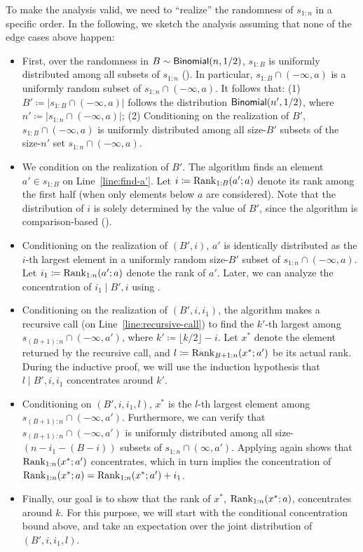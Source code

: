 To make the analysis valid, we need to ``realize'' the randomness of $s_{1:n}$ in a specific order. In the following, we sketch the analysis assuming that none of the edge cases above happen:
\begin{itemize}
    \item First, over the randomness in $B \sim \mathsf{Binomial}(n, 1/2)$, $s_{1:B}$ is uniformly distributed among all subsets of $s_{1:n}$ (). In particular, $s_{1:B} \cap (-\infty, a)$ is a uniformly random subset of $s_{1:n} \cap (-\infty, a)$. It follows that: (1) $B' \coloneqq |s_{1:B} \cap (-\infty, a)|$ follows the distribution $\mathsf{Binomial}(n', 1/2)$, where $n' \coloneqq |s_{1:n} \cap (-\infty, a)|$; (2) Conditioning on the realization of $B'$, $s_{1:B} \cap (-\infty, a)$ is uniformly distributed among all size-$B'$ subsets of the size-$n'$ set $s_{1:n} \cap (-\infty, a)$. 
    \item We condition on the realization of $B'$. The algorithm finds an element $a' \in s_{1:B}$ on Line~\ref{line:find-a'}. Let $i \coloneqq \mathrm{Rank}_{1:B}(a'; a)$ denote its rank among the first half (when only elements below $a$ are considered). Note that the distribution of $i$ is solely determined by the value of $B'$, since the algorithm is comparison-based ().
    \item Conditioning on the realization of $(B', i)$, $a'$ is identically distributed as the $i$-th largest element in a uniformly random size-$B'$ subset of $s_{1:n} \cap (-\infty, a)$. Let $i_1 \coloneqq \mathrm{Rank}_{1:n}(a'; a)$ denote the rank of $a'$. Later, we can analyze the concentration of $i_1 \mid B', i$ using . 
    \item Conditioning on the realization of $(B', i, i_1)$, the algorithm makes a recursive call (on Line~\ref{line:recursive-call}) to find the $k'$-th largest among $s_{(B+1):n} \cap (-\infty, a')$, where $k' \coloneqq \lfloor k/2\rfloor - i$. Let $x^*$ denote the element returned by the recursive call, and $l \coloneqq \mathrm{Rank}_{B+1:n}(x^*; a')$ be its actual rank. During the inductive proof, we will use the induction hypothesis that $l \mid B', i, i_1$ concentrates around $k'$.
    \item Conditioning on $(B', i, i_1, l)$, $x^*$ is the $l$-th largest element among $s_{(B+1):n} \cap (-\infty, a')$. Furthermore, we can verify that $s_{(B+1):n} \cap (-\infty, a')$ is uniformly distributed among all size-$(n - i_1 - (B - i))$ subsets of $s_{1:n} \cap (\infty, a')$. Applying  again shows that $\mathrm{Rank}_{1:n}(x^*; a')$ concentrates, which in turn implies the concentration of $\mathrm{Rank}_{1:n}(x^*; a) = \mathrm{Rank}_{1:n}(x^*; a') + i_1$.
    \item Finally, our goal is to show that the rank of $x^*$, $\mathrm{Rank}_{1:n}(x^*; a)$, concentrates around $k$. For this purpose, we will start with the conditional concentration bound above, and take an expectation over the joint distribution of $(B', i, i_1, l)$.
\end{itemize}

